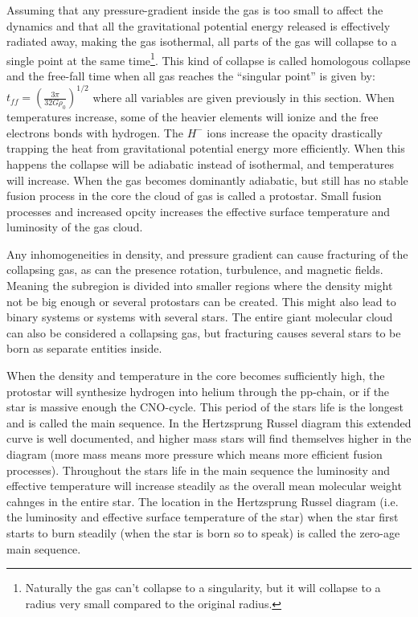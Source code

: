 Assuming that any pressure-gradient inside the gas is too small to affect the dynamics and that all the gravitational potential energy released is effectively radiated away, making the gas isothermal, all parts of the gas will collapse to a single point at the same time\footnote{Naturally the gas can't collapse to a singularity, but it will collapse to a radius very small compared to the original radius.}. This kind of collapse is called homologous collapse and the free-fall time when all gas reaches the ``singular point'' is given by:
$t_{ff} = \left(\frac{3\pi}{32G\rho_0}\right)^{1/2}$ where all variables are given previously in this section.
When temperatures increase, some of the heavier elements will ionize and the free electrons bonds with hydrogen. The $H^-$ ions increase the opacity drastically trapping the heat from gravitational potential energy more efficiently.
When this happens the collapse will be adiabatic instead of isothermal, and temperatures will increase.
When the gas becomes dominantly adiabatic, but still has no stable fusion process in the core the cloud of gas is called a protostar.
Small fusion processes and increased opcity increases the effective surface temperature and luminosity of the gas cloud.

Any inhomogeneities in density, and pressure gradient can cause fracturing of the collapsing gas, as can the presence rotation, turbulence, and magnetic fields. Meaning the subregion is divided into smaller regions where the density might not be big enough or several protostars can be created.
This might also lead to binary systems or systems with several stars.
The entire giant molecular cloud can also be considered a collapsing gas, but fracturing causes several stars to be born as separate entities inside.

When the density and temperature in the core becomes sufficiently high, the protostar will synthesize hydrogen into helium through the pp-chain, or if the star is massive enough the CNO-cycle.
This period of the stars life is the longest and is called the main sequence.
In the Hertzsprung Russel diagram this extended curve is well documented, and higher mass stars will find themselves higher in the diagram (more mass means more pressure which means more efficient fusion processes).
Throughout the stars life in the main sequence the luminosity and effective temperature will increase steadily as the overall mean molecular weight cahnges in the entire star.
The location in the Hertzsprung Russel diagram (i.e. the luminosity and effective surface temperature of the star) when the star first starts to burn steadily (when the star is born so to speak) is called the zero-age main sequence.

